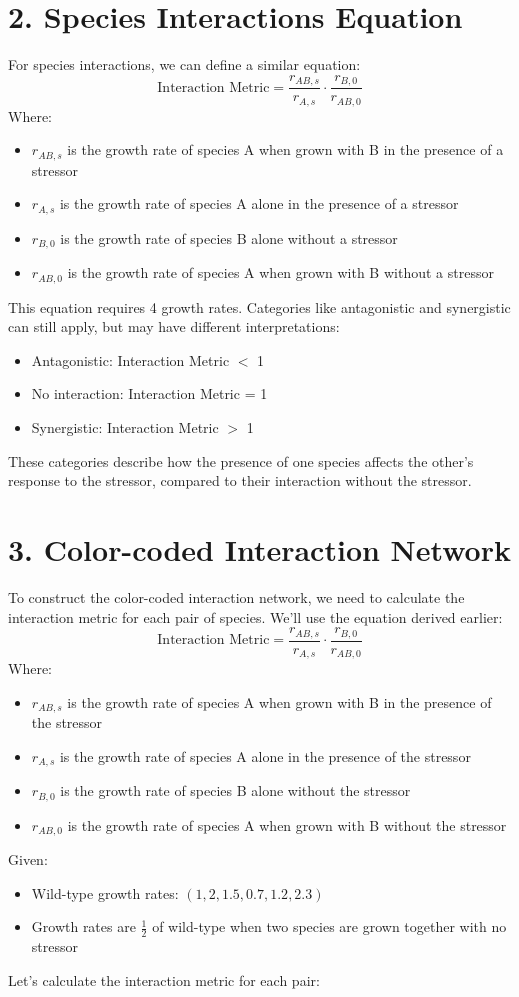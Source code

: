 \documentclass{article}
\begin{document}
\section*{2. Species Interactions Equation}
For species interactions, we can define a similar equation:
\begin{equation}
\text{Interaction Metric} = \frac{r_{AB,s}}{r_{A,s}} \cdot \frac{r_{B,0}}{r_{AB,0}}
\end{equation}
Where:
\begin{itemize}
\item $r_{AB,s}$ is the growth rate of species A when grown with B in the presence of a stressor
\item $r_{A,s}$ is the growth rate of species A alone in the presence of a stressor
\item $r_{B,0}$ is the growth rate of species B alone without a stressor
\item $r_{AB,0}$ is the growth rate of species A when grown with B without a stressor
\end{itemize}
This equation requires 4 growth rates.
Categories like antagonistic and synergistic can still apply, but may have different interpretations:
\begin{itemize}
\item Antagonistic: Interaction Metric $<$ 1
\item No interaction: Interaction Metric = 1
\item Synergistic: Interaction Metric $>$ 1
\end{itemize}
These categories describe how the presence of one species affects the other's response to the stressor, compared to their interaction without the stressor.

\section*{3. Color-coded Interaction Network}
To construct the color-coded interaction network, we need to calculate the interaction metric for each pair of species. We'll use the equation derived earlier:
\[ \text{Interaction Metric} = \frac{r_{AB,s}}{r_{A,s}} \cdot \frac{r_{B,0}}{r_{AB,0}} \]
Where:
\begin{itemize}
\item $r_{AB,s}$ is the growth rate of species A when grown with B in the presence of the stressor
\item $r_{A,s}$ is the growth rate of species A alone in the presence of the stressor
\item $r_{B,0}$ is the growth rate of species B alone without the stressor
\item $r_{AB,0}$ is the growth rate of species A when grown with B without the stressor
\end{itemize}
Given:
\begin{itemize}
\item Wild-type growth rates: $(1, 2, 1.5, 0.7, 1.2, 2.3)$
\item Growth rates are $\frac{1}{2}$ of wild-type when two species are grown together with no stressor
\end{itemize}
Let's calculate the interaction metric for each pair:
\end{document}
